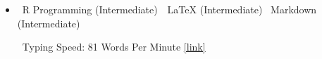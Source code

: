 
\begin{itemize}
    \item[] \textbullet\, R Programming (Intermediate)\, \textbullet \, LaTeX (Intermediate) \textbullet \, Markdown (Intermediate) \par\textbullet \ Typing Speed: 81 Words Per Minute \href{https://data.typeracer.com/misc/badge?user=tarek_racer}{[link]}
\end{itemize}

